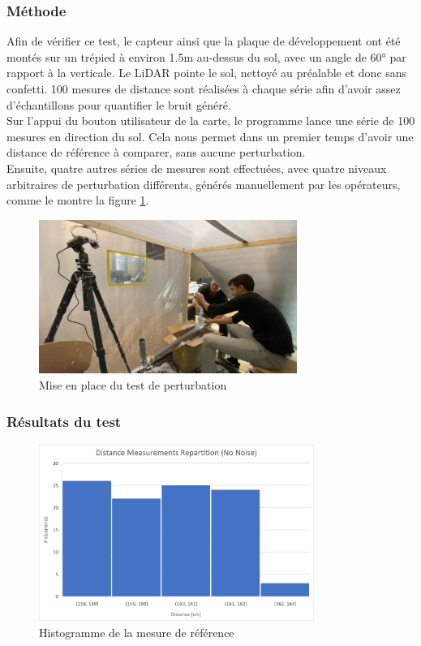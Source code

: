 \subsubsection{Méthode}

Afin de vérifier ce test, le capteur ainsi que la plaque de développement ont été montés sur un trépied
à environ 1.5m au-dessus du sol, avec un angle de 60° par rapport à la verticale. Le LiDAR pointe le sol,
nettoyé au préalable et donc sans confetti. 100 mesures de distance sont réalisées à chaque série afin
d'avoir assez d'échantillons pour quantifier le bruit généré.\\
Sur l'appui du bouton utilisateur de la carte, le programme lance une série de 100 mesures en direction
du sol. Cela nous permet dans un premier temps d'avoir une distance de référence à comparer, sans aucune
perturbation. \\
Ensuite, quatre autres séries de mesures sont effectuées, avec quatre niveaux arbitraires de perturbation
différents, générés manuellement par les opérateurs, comme le montre la figure \ref{fig:ErrorMesSetup}.

\begin{figure}[H]
    \centering
    \includegraphics[width=0.75\textwidth]{Images/LiDAR/ErrorMesSetup.jpeg}
    \caption{Mise en place du test de perturbation}
    \label{fig:ErrorMesSetup}
\end{figure}

\subsubsection{Résultats du test}

\begin{figure}[H]
    \centering
    \includegraphics[width=0.8\textwidth]{Images/LiDAR/LiDAR_ErrorMes_NoNoise.png}
    \caption{Histogramme de la mesure de référence}
    \label{fig:ErrorMesRefDist}
\end{figure}

